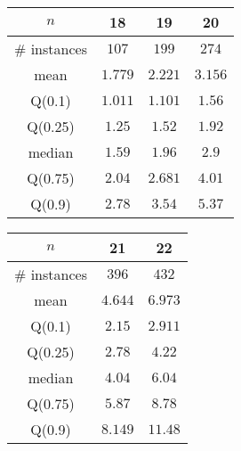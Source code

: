 \begin{tabular}{c|ccc} 
\hline 
$n$ & 18 & 19 & 20 \tabularnewline 
\hline 
\hline 
\# instances & $107$ & $199$ & $274$ \tabularnewline 
mean & $1.779$ & $2.221$ & $3.156$ \tabularnewline 
Q(0.1) & $1.011$ & $1.101$ & $1.56$ \tabularnewline 
Q(0.25) & $1.25$ & $1.52$ & $1.92$ \tabularnewline 
median & $1.59$ & $1.96$ & $2.9$ \tabularnewline 
Q(0.75) & $2.04$ & $2.681$ & $4.01$ \tabularnewline 
Q(0.9) & $2.78$ & $3.54$ & $5.37$ \tabularnewline 
\hline 
\end{tabular} 
\medskip{} 

\begin{tabular}{c|cc} 
\hline 
$n$ & 21 & 22 \tabularnewline 
\hline 
\hline 
\# instances & $396$ & $432$ \tabularnewline 
mean & $4.644$ & $6.973$ \tabularnewline 
Q(0.1) & $2.15$ & $2.911$ \tabularnewline 
Q(0.25) & $2.78$ & $4.22$ \tabularnewline 
median & $4.04$ & $6.04$ \tabularnewline 
Q(0.75) & $5.87$ & $8.78$ \tabularnewline 
Q(0.9) & $8.149$ & $11.48$ \tabularnewline 
\hline 
\end{tabular} 
\medskip{} 

